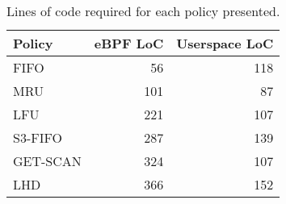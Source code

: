 \begin{table}
\caption{Lines of code required for each policy presented.}
\label{tab:loc-per-policy}
\begin{tabular}{lrr}
\toprule
Policy & eBPF LoC & Userspace LoC \\
\midrule
FIFO & 56 & 118 \\
MRU & 101 & 87 \\
LFU & 221 & 107 \\
S3-FIFO & 287 & 139 \\
GET-SCAN & 324 & 107 \\
LHD & 366 & 152 \\
\bottomrule
\end{tabular}
\end{table}
